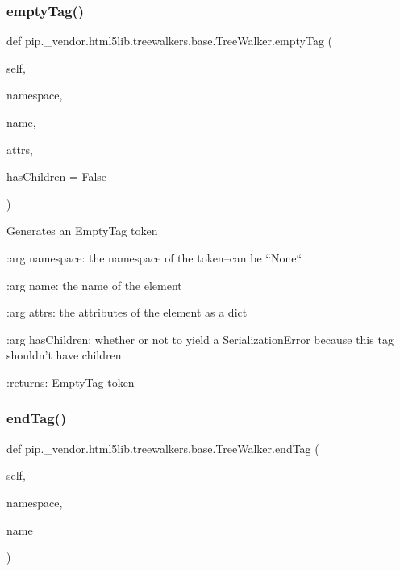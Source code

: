 \subsubsection{\texorpdfstring{empty\+Tag()}{emptyTag()}}
{\footnotesize\ttfamily def pip.\+\_\+vendor.\+html5lib.\+treewalkers.\+base.\+Tree\+Walker.\+empty\+Tag (\begin{DoxyParamCaption}\item[{}]{self,  }\item[{}]{namespace,  }\item[{}]{name,  }\item[{}]{attrs,  }\item[{}]{has\+Children = {\ttfamily False} }\end{DoxyParamCaption})}

\begin{DoxyVerb}Generates an EmptyTag token

:arg namespace: the namespace of the token--can be ``None``

:arg name: the name of the element

:arg attrs: the attributes of the element as a dict

:arg hasChildren: whether or not to yield a SerializationError because
    this tag shouldn't have children

:returns: EmptyTag token\end{DoxyVerb}
 \mbox{\label{classpip_1_1__vendor_1_1html5lib_1_1treewalkers_1_1base_1_1TreeWalker_a604859d9a761510d7611c9196a45afe6}} 
\subsubsection{\texorpdfstring{end\+Tag()}{endTag()}}
{\footnotesize\ttfamily def pip.\+\_\+vendor.\+html5lib.\+treewalkers.\+base.\+Tree\+Walker.\+end\+Tag (\begin{DoxyParamCaption}\item[{}]{self,  }\item[{}]{namespace,  }\item[{}]{name }\end{DoxyParamCaption})}

